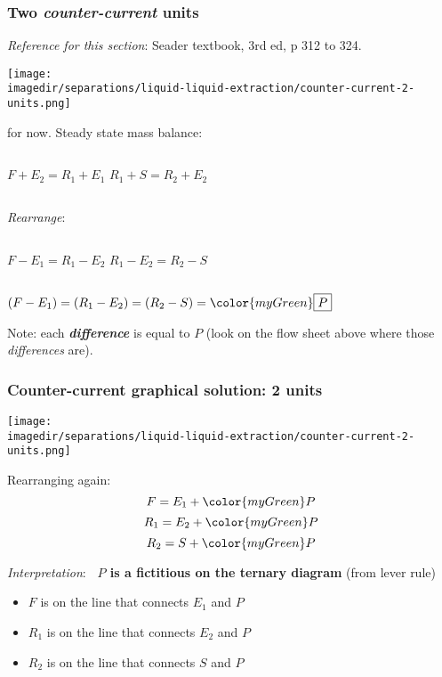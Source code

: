 \begin{frame}\frametitle{Two \emph{counter-current} units}
	\emph{Reference for this section}: {\color{myOrange}Seader textbook, 3rd ed, p 312 to 324.}
	\begin{center}
		\texttt{[image: \\imagedir/separations/liquid-liquid-extraction/counter-current-2-units.png]}
	\end{center}
	\textbf{{\color{myGreen}{Consider $N=2$ stages}}} for now. Steady state mass balance:
	\begin{center}
		\begin{columns}[t]
				$F + E_2 = R_1 + E_1$
				$R_1 + S = R_2 + E_2$
		\end{columns}
	\end{center}
	\emph{Rearrange}:
	\begin{center}
		\begin{columns}[t]
				$F - E_1 = R_1 - E_2$
				$R_1 - E_2 = R_2 - S$
		\end{columns}
		\vspace{12pt}
		$(F - E_1)  =  (R_1 - E_2) = (R_2 - S) = {\color{myGreen}\fbox{$P$}}$
	\end{center}
	Note: each \textbf{\emph{difference}} is equal to {\color{myGreen}$P$} (look on the flow sheet above where those \emph{differences} are).
\end{frame}

\begin{frame}\frametitle{Counter-current graphical solution: 2 units}
	\begin{center}
		\texttt{[image: \\imagedir/separations/liquid-liquid-extraction/counter-current-2-units.png]}
	\end{center}

	Rearranging again:
	\[	F   = E_1 + {\color{myGreen}P} \]
	\[	R_1 = E_2 + {\color{myGreen}P} \]
	\[	R_2 = S   + {\color{myGreen}P} \]

	\emph{Interpretation}: \textbf{~{\color{myGreen}$P$} is a fictitious {\color{purple}{operating point}} on the ternary diagram} (from lever rule)
	\vspace{6pt}
	\begin{itemize}
		\item	$F$ is on the line that connects $E_1$ and {\color{myGreen}$P$}
		\item	$R_1$ is on the line that connects $E_2$ and {\color{myGreen}$P$}
		\item	$R_2$ is on the line that connects $S$ and {\color{myGreen}$P$}
	\end{itemize}
\end{frame}

